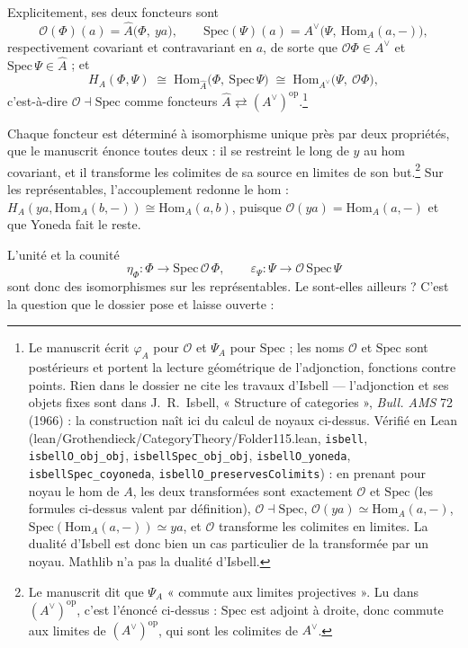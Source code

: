 \documentclass[11pt,a4paper]{article}
\begin{document}
Explicitement, ses deux foncteurs sont
\[
\mathcal{O}(\Phi)(a) = \widehat{A}\bigl(\Phi,\ y a\bigr), \qquad
\mathrm{Spec}(\Psi)(a) = A^{\vee}\bigl(\Psi,\ \mathrm{Hom}_{A}(a,-)\bigr),
\]
respectivement covariant et contravariant en $a$, de sorte que
$\mathcal{O}\Phi \in A^{\vee}$ et $\mathrm{Spec}\,\Psi \in \widehat{A}$ ; et
\[
H_{A}(\Phi, \Psi)
\;\cong\; \mathrm{Hom}_{\widehat{A}}\bigl(\Phi,\ \mathrm{Spec}\,\Psi\bigr)
\;\cong\; \mathrm{Hom}_{A^{\vee}}\bigl(\Psi,\ \mathcal{O}\Phi\bigr),
\]
c'est-à-dire $\mathcal{O} \dashv \mathrm{Spec}$ comme foncteurs $\widehat{A}
\rightleftarrows (A^{\vee})^{\mathrm{op}}$.\footnote{Le manuscrit écrit
$\varphi_{A}$ pour $\mathcal{O}$ et $\Psi_{A}$ pour $\mathrm{Spec}$ ; les noms
$\mathcal{O}$ et $\mathrm{Spec}$ sont postérieurs et portent la lecture
géométrique de l'adjonction, fonctions contre points. Rien dans le dossier ne
cite les travaux d'Isbell --- l'adjonction et ses objets fixes sont dans
J.~R.~Isbell, « Structure of categories », \emph{Bull. AMS} 72 (1966) : la
construction naît ici du calcul de noyaux ci-dessus. Vérifié en Lean
(lean/Grothendieck/CategoryTheory/Folder115.lean, \texttt{isbell},
\texttt{isbellO\_obj\_obj}, \texttt{isbellSpec\_obj\_obj},
\texttt{isbellO\_yoneda}, \texttt{isbellSpec\_coyoneda},
\texttt{isbellO\_preservesColimits}) : en prenant pour noyau le hom de $A$,
les deux transformées sont exactement $\mathcal{O}$ et $\mathrm{Spec}$ (les
formules ci-dessus valent par définition), $\mathcal{O} \dashv \mathrm{Spec}$,
$\mathcal{O}(y a) \simeq \mathrm{Hom}_{A}(a, -)$, $\mathrm{Spec}(\mathrm{Hom}_{A}(a,
-)) \simeq y a$, et $\mathcal{O}$ transforme les colimites en limites. La
dualité d'Isbell est donc bien un cas particulier de la transformée par un
noyau. Mathlib n'a pas la dualité d'Isbell.}

Chaque foncteur est déterminé à isomorphisme unique près par deux propriétés,
que le manuscrit énonce toutes deux : il se restreint le long de $y$ au hom
covariant, et il transforme les colimites de sa source en limites de son
but.\footnote{Le manuscrit dit que $\Psi_{A}$ « commute aux limites
projectives ». Lu dans $(A^{\vee})^{\mathrm{op}}$, c'est l'énoncé ci-dessus :
$\mathrm{Spec}$ est adjoint à droite, donc commute aux limites de
$(A^{\vee})^{\mathrm{op}}$, qui sont les colimites de $A^{\vee}$.} Sur les
représentables, l'accouplement redonne le hom :
$H_{A}(y a, \mathrm{Hom}_{A}(b,-)) \cong \mathrm{Hom}_{A}(a,b)$, puisque
$\mathcal{O}(y a) = \mathrm{Hom}_{A}(a,-)$ et que Yoneda fait le reste.

L'unité et la counité
\[
\eta_{\Phi} : \Phi \longrightarrow \mathrm{Spec}\,\mathcal{O}\,\Phi,
\qquad
\varepsilon_{\Psi} : \Psi \longrightarrow \mathcal{O}\,\mathrm{Spec}\,\Psi
\]
sont donc des isomorphismes sur les représentables. Le sont-elles ailleurs ?
C'est la question que le dossier pose et laisse ouverte :
\end{document}
